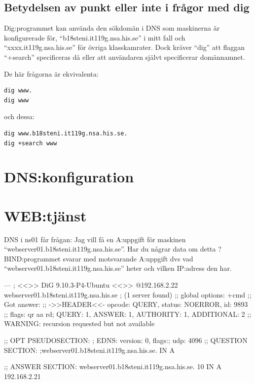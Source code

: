 \documentclass[swedish,10pt,a4paper]{article}
\begin{document}

\subsection{Betydelsen av punkt eller inte i frågor med dig}

Dig:programmet kan använda den sökdomän i DNS som maskinerna är konfigurerade för, ``b18steni.it119g.nsa.his.se'' i mitt fall och ``xxxx.it119g.nsa.his.se''
för övriga klasskamrater.
Dock kräver ``dig'' att flaggan ``+search'' specificeras då eller att användaren självt specificerar domännamnet.

De här frågorna är ekvivalenta:
\begin{verbatim}
dig www.
dig www
\end{verbatim}
och dessa:
\begin{verbatim}
dig www.b18steni.it119g.nsa.his.se.
dig +search www
\end{verbatim}

\section{DNS:konfiguration}\label{sec:dns_config}

\section{WEB:tjänst}\label{sec:httpd_config}

DNS i ns01 får frågan:
Jag vill få en A:uppgift för maskinen ``webserver01.b18steni.it119g.nsa.his.se''.
Har du någrar data om detta ?
BIND:programmet svarar med motsvarande A:uppgift dvs vad ``webserver01.b18steni.it119g.nsa.his.se''
heter och vilken IP:adress den har.

---
; <<>> DiG 9.10.3-P4-Ubuntu <<>> @192.168.2.22 webserver01.b18steni.it119g.nsa.his.se
; (1 server found)
;; global options: +cmd
;; Got answer:
;; ->>HEADER<<- opcode: QUERY, status: NOERROR, id: 9893
;; flags: qr aa rd; QUERY: 1, ANSWER: 1, AUTHORITY: 1, ADDITIONAL: 2
;; WARNING: recursion requested but not available

;; OPT PSEUDOSECTION:
; EDNS: version: 0, flags:; udp: 4096
;; QUESTION SECTION:
;webserver01.b18steni.it119g.nsa.his.se.	IN A

;; ANSWER SECTION:
webserver01.b18steni.it119g.nsa.his.se.	10 IN A	192.168.2.21
\end{document}
